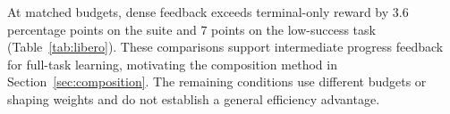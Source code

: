 At matched budgets, dense feedback exceeds terminal-only reward by 3.6 percentage points on the suite and 7 points on the low-success task (Table~\ref{tab:libero}). These comparisons support intermediate progress feedback for full-task learning, motivating the composition method in Section~\ref{sec:composition}. The remaining conditions use different budgets or shaping weights and do not establish a general efficiency advantage.

